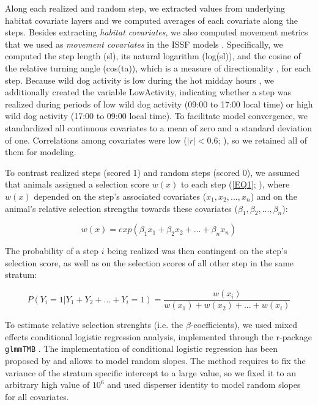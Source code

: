 \documentclass[abstract=on,10pt,a4paper,bibliography=totocnumbered]{article}
\begin{document}
Along each realized and random step, we extracted values from underlying habitat
covariate layers and we computed averages of each covariate along the steps.
Besides extracting \textit{habitat covariates}, we also computed movement
metrics that we used as \textit{movement covariates} in the ISSF models
\citep{Avgar.2016, Fieberg.2021}. Specifically, we computed the step length
(\textsf{sl}), its natural logarithm (\textsf{log(sl)}), and the cosine of the
relative turning angle (\textsf{cos(ta)}), which is a measure of directionality
\citep{Turchin.1998}, for each step. Because wild dog activity is low during the
hot midday hours \citep{Cozzi.2012}, we additionally created the variable
\textsf{LowActivity}, indicating whether a step was realized during periods of
low wild dog activity (09:00 to 17:00 local time) or high wild dog activity
(17:00 to 09:00 local time). To facilitate model convergence, we standardized
all continuous covariates to a mean of zero and a standard deviation of one.
Correlations among covariates were low (\(|r| < 0.6\); \citealp{Latham.2011}),
so we retained all of them for modeling.

To contrast realized steps (scored 1) and random steps (scored 0), we assumed
that animals assigned a selection score \(w(x)\) to each step (\ref{EQ1};
\citealp{Fortin.2005}), where \(w(x)\) depended on the step's associated
covariates (\(x_1, x_2, ..., x_n\)) and on the animal's relative selection
strengths \citep{Avgar.2017} towards these covariates (\(\beta_1, \beta_2,
..., \beta_n\)):

\begin{equation}
\label{EQ1}
  w(x) = exp(\beta_1 x_1 + \beta_2 x_2 + ... + \beta_n x_n)
\end{equation}

\noindent The probability of a step \(i\) being realized was then contingent on
the step's selection score, as well as on the selection scores of all other step
in the same stratum:

\begin{equation}
\label{EQ2}
  P(Y_{i} = 1 | Y_{1} + Y_{2} + ... + Y_{i} = 1) =
  \frac{w(x_{i})}{w(x_{1}) + w(x_{2}) + ... + w(x_{i})}
\end{equation}

\noindent To estimate relative selection strenghts (i.e. the
\(\beta\)-coefficients), we used mixed effects conditional logistic regression
analysis, implemented through the r-package {\tt glmmTMB} \citep{Brooks.2017}.
The implementation of conditional logistic regression has been proposed by
\cite{Muff.2020} and allows to model random slopes. The method requires to fix
the variance of the stratum specific intercept to a large value, so we fixed it
to an arbitrary high value of \(10 ^ 6\) and used disperser identity to model
random slopes for all covariates.
\end{document}
